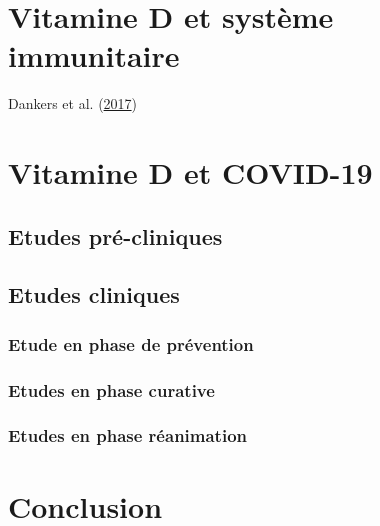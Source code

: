 \documentclass[
  letterpaper,
  DIV=11,
  numbers=noendperiod]{scrartcl}
\begin{document}
\hypertarget{vitamine-d-et-systuxe8me-immunitaire}{%
\section{Vitamine D et système
immunitaire}\label{vitamine-d-et-systuxe8me-immunitaire}}

Dankers et al. (\protect\hyperlink{ref-Dankers.2017}{2017})

\hypertarget{vitamine-d-et-covid-19}{%
\section{Vitamine D et COVID-19}\label{vitamine-d-et-covid-19}}

\hypertarget{etudes-pruxe9-cliniques}{%
\subsection{Etudes pré-cliniques}\label{etudes-pruxe9-cliniques}}

\hypertarget{etudes-cliniques}{%
\subsection{Etudes cliniques}\label{etudes-cliniques}}

\hypertarget{etude-en-phase-de-pruxe9vention}{%
\subsubsection{Etude en phase de
prévention}\label{etude-en-phase-de-pruxe9vention}}

\hypertarget{etudes-en-phase-curative}{%
\subsubsection{Etudes en phase
curative}\label{etudes-en-phase-curative}}

\hypertarget{etudes-en-phase-ruxe9animation}{%
\subsubsection{Etudes en phase
réanimation}\label{etudes-en-phase-ruxe9animation}}

\newpage{}

\hypertarget{conclusion}{%
\section{Conclusion}\label{conclusion}}
\end{document}
